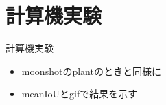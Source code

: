 \section{計算機実験}

\begin{frame}[noframenumbering]{計算機実験}
    \begin{itemize}
        \item moonshotのplantのときと同様に
        \item meanIoUとgifで結果を示す
    \end{itemize}
\end{frame}